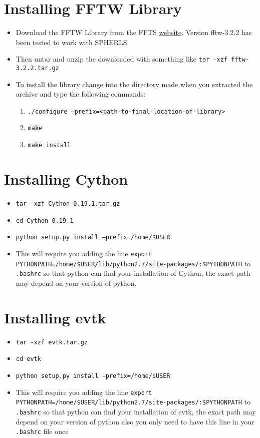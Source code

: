\documentclass[12pt,a4paper]{book}
\begin{document}
\section{Installing FFTW Library}
\begin{itemize}
\item Download the FFTW Library from the FFTS \href{http://www.fftw.org/download.html}{website}. Version fftw-3.2.2 has been tested to work with SPHERLS.
\item Then untar and unzip the downloaded with something like {\tt tar -xzf fftw-3.2.2.tar.gz}
\item To install the library change into the directory made when you extracted the archive and type the following commands:
\begin{enumerate}
\item {\tt ./configure --prefix=<path-to-final-location-of-library>}
\item {\tt make}
\item {\tt make install}
\end{enumerate}
\end{itemize}

\section{Installing Cython}
\begin{itemize}
\item {\tt tar -xzf Cython-0.19.1.tar.gz}
\item {\tt cd Cython-0.19.1}
\item {\tt  python setup.py install --prefix=/home/\-\$USER}
\item This will require you adding the  line {\tt export PYTHONPATH\-=/home/\-\$USER/\-lib/\-python2.7/\-site-packages/\-:\$PYTHONPATH} to {\tt .bashrc} so that python can find your installation of Cython, the exact path may depend on your version of python.
\end{itemize}

\section{Installing evtk}
\begin{itemize}
\item {\tt tar -xzf evtk.tar.gz}
\item {\tt cd evtk}
\item {\tt  python setup.py install --prefix=/home/\$USER}
\item This will require you adding the line {\tt export PYTHONPATH\-=/home/\-\$USER/\-lib/\-python2.7/\-site-packages/\-:\$PYTHONPATH} to {\tt .bashrc} so that python can find your installation of evtk, the exact path may depend on your version of python also you only need to have this line in your {\tt .bashrc} file once
\end{itemize}
\end{document}
